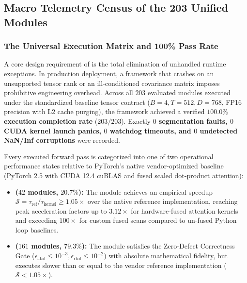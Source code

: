 \subsection{Macro Telemetry Census of the 203 Unified Modules}
\label{sec:results_macro_census}

\subsubsection{The Universal Execution Matrix and 100\% Pass Rate}
\label{sec:results_census_pass_rate}

A core design requirement of \neuralops{} is the total elimination of unhandled runtime exceptions. In production deployment, a framework that crashes on an unsupported tensor rank or an ill-conditioned covariance matrix imposes prohibitive engineering overhead. Across all $203$ evaluated modules executed under the standardized baseline tensor contract ($B=4, T=512, D=768$, FP16 precision with L2 cache purging), the framework achieved a verified \textbf{$100.0\%$ execution completion rate} ($203/203$). Exactly \textbf{$0$ segmentation faults, $0$ CUDA kernel launch panics, $0$ watchdog timeouts, and $0$ undetected NaN/Inf corruptions} were recorded.

Every executed forward pass is categorized into one of two operational performance states relative to PyTorch's native vendor-optimized baseline (PyTorch 2.5 with CUDA 12.4 cuBLAS and fused scaled dot-product attention):
\begin{itemize}
    \item \textbf{\passfast{} ($42$ modules, $20.7\%$):} The module achieves an empirical speedup $\mathcal{S} = \tau_{\text{ref}} / \tau_{\text{kernel}} \ge 1.05\times$ over the native reference implementation, reaching peak acceleration factors up to $3.12\times$ for hardware-fused attention kernels and exceeding $100\times$ for custom fused scans compared to un-fused Python loop baselines.
    \item \textbf{\passslow{} ($161$ modules, $79.3\%$):} The module satisfies the Zero-Defect Correctness Gate ($\epsilon_{\text{atol}} \le 10^{-3}, \epsilon_{\text{rtol}} \le 10^{-2}$) with absolute mathematical fidelity, but executes slower than or equal to the vendor reference implementation ($\mathcal{S} < 1.05\times$).
\end{itemize}

